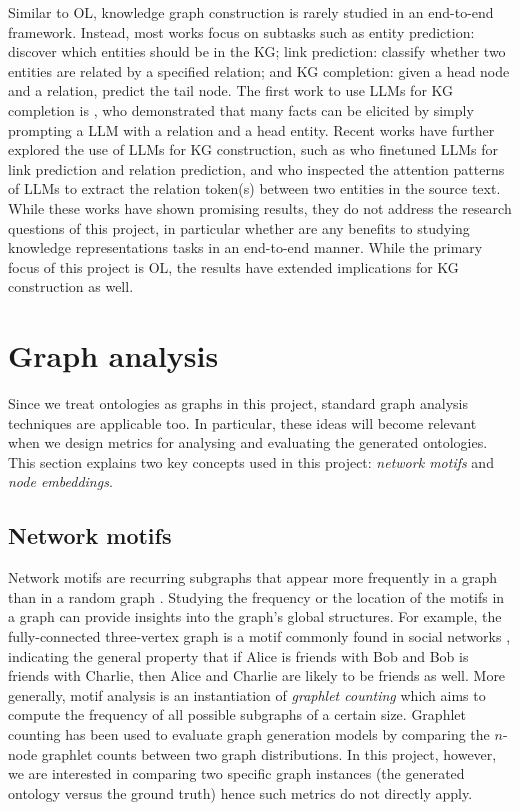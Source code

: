 Similar to OL, knowledge graph construction is rarely studied in an end-to-end framework. Instead, most works focus on subtasks such as entity prediction: discover which entities should be in the KG; link prediction: classify whether two entities are related by a specified relation; and KG completion: given a head node and a relation, predict the tail node.  The first work to use LLMs for KG completion is \citet{petroni2019language}, who demonstrated that many facts can be elicited by simply prompting a LLM with a relation and a head entity. Recent works have further explored the use of LLMs for KG construction, such as \citet{yao2023exploring} who finetuned LLMs for link prediction and relation prediction, and \citet{wang2020language} who inspected the attention patterns of LLMs to extract the relation token(s) between two entities in the source text. While these works have shown promising results, they do not address the research questions of this project, in particular whether are any benefits to studying knowledge representations tasks in an end-to-end manner. While the primary focus of this project is OL, the results have extended implications for KG construction as well.

\section{Graph analysis}

Since we treat ontologies as graphs in this project, standard graph analysis techniques are applicable too. In particular, these ideas will become relevant when we design metrics for analysing and evaluating the generated ontologies. This section explains two key concepts used in this project: \emph{network motifs} and \emph{node embeddings}.

\subsection{Network motifs}  \label{sec:network-motifs}

Network motifs are recurring subgraphs that appear more frequently in a graph than in a random graph \cite{milo2002network}. Studying the frequency or the location of the motifs in a graph can provide insights into the graph's global structures. For example, the fully-connected three-vertex graph is a motif commonly found in social networks \cite{stone2019network}, indicating the general property that if Alice is friends with Bob and Bob is friends with Charlie, then Alice and Charlie are likely to be friends as well. More generally, motif analysis is an instantiation of \emph{graphlet counting} \cite{ribeiro2021survey} which aims to compute the frequency of all possible subgraphs of a certain size. Graphlet counting has been used to evaluate graph generation models \cite{you2018graphrnn} by comparing the $n$-node graphlet counts between two graph distributions. In this project, however, we are interested in comparing two specific graph instances (the generated ontology versus the ground truth) hence such metrics do not directly apply.

